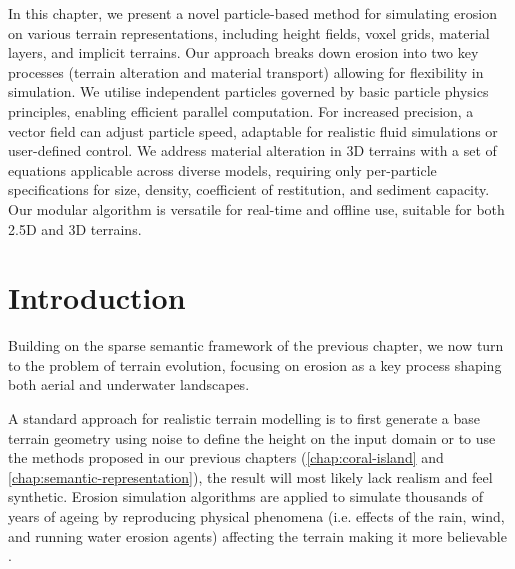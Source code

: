 
\abstract
In this chapter, we present a novel particle-based method for simulating erosion on various terrain representations, including height fields, voxel grids, material layers, and implicit terrains. Our approach breaks down erosion into two key processes (terrain alteration and material transport) allowing for flexibility in simulation. We utilise independent particles governed by basic particle physics principles, enabling efficient parallel computation. For increased precision, a vector field can adjust particle speed, adaptable for realistic fluid simulations or user-defined control. We address material alteration in 3D terrains with a set of equations applicable across diverse models, requiring only per-particle specifications for size, density, coefficient of restitution, and sediment capacity. Our modular algorithm is versatile for real-time and offline use, suitable for both 2.5D and 3D terrains.
\pagebreak

\minitoc

\section{Introduction}
Building on the sparse semantic framework of the previous chapter, we now turn to the problem of terrain evolution, focusing on erosion as a key process shaping both aerial and underwater landscapes. 

A standard approach for realistic terrain modelling is to first generate a base terrain geometry using noise to define the height on the input domain \cite{Musgrave1989, Olsen2004, Roudier1993} or to use the methods proposed in our previous chapters (\cref{chap:coral-island} and \cref{chap:semantic-representation}), the result will most likely lack realism and feel synthetic. Erosion simulation algorithms are applied to simulate thousands of years of ageing by reproducing physical phenomena (i.e. effects of the rain, wind, and running water erosion agents) affecting the terrain making it more believable \cite{Stachniak2005, Smelik2009, Galin2019}.

